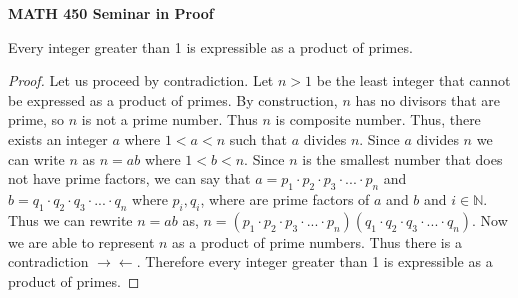 \documentclass[12pt, fullpage]{article}
\newcommand{\N}{\mathbb N}
\begin{document}
\begin{center}
		
{\bf MATH 450 Seminar in Proof}
 \\
\end{center}
	Every integer greater than 1 is expressible as a product of primes.
\begin{proof}
	Let us proceed by contradiction. Let $n > 1$ be the least integer that cannot be expressed as a product of primes. By construction, $n$ has no divisors that are prime, so $n$ is not a prime number. Thus $n$ is composite number. Thus, there exists an integer $a$ where $1 < a < n$ such that $a$ divides $n$. Since $a$ divides $n$ we can write $n$ as $n = ab$ where $1<b<n$. Since $n$ is the smallest number that does not have prime factors, we can say that $a = p_1 \cdot p_2 \cdot p_3 \cdot ... \cdot p_n$ and $b = q_1 \cdot q_2 \cdot q_3 \cdot ... \cdot q_n$ where $p_i, q_i$, where are prime factors of $a$ and $b$ and $i \in \N$. Thus we can rewrite $n = ab$ as, $n = (p_1 \cdot p_2 \cdot p_3 \cdot ... \cdot p_n)(q_1 \cdot q_2 \cdot q_3 \cdot ... \cdot q_n)$. Now we are able to represent $n$ as a product of prime numbers. Thus there is a contradiction $\rightarrow\leftarrow$. Therefore every integer greater than 1 is expressible as a product of primes.
\end{proof}
\end{document}
